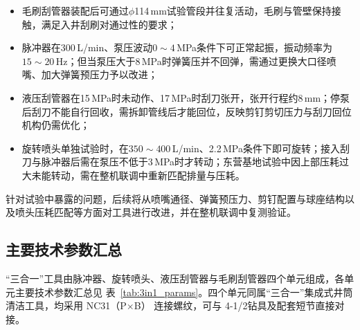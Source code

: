 \begin{itemize}
	\item 毛刷刮管器装配后可通过$\phi$114\,mm试验管段并往复活动，毛刷与管壁保持接触，满足入井刮刷对通过性的要求；
	\item 脉冲器在300\,L/min、泵压波动$0\sim4$\,MPa条件下可正常起振，振动频率为$15\sim20$\,Hz；但当泵压大于8\,MPa时弹簧压并不回弹，需通过更换大口径喷嘴、加大弹簧预压力予以改进；
	\item 液压刮管器在15\,MPa时未动作、17\,MPa时刮刀张开，张开行程约8\,mm；停泵后刮刀不能自行回收，需拆卸管线后才能回位，反映剪钉剪切压力与刮刀回位机构仍需优化；
	\item 旋转喷头单独试验时，在$350\sim400$\,L/min、2.2\,MPa条件下即可旋转；接入刮刀与脉冲器后需在泵压不低于3\,MPa时才转动；东营基地试验中因上部压耗过大未能转动，需在整机联调中重新匹配排量与压耗。
\end{itemize}

针对试验中暴露的问题，后续将从喷嘴通径、弹簧预压力、剪钉配置与球座结构以及喷头压耗匹配等方面对工具进行改进，并在整机联调中复测验证。

\subsection{主要技术参数汇总}

“三合一”工具由脉冲器、旋转喷头、液压刮管器与毛刷刮管器四个单元组成，各单元主要技术参数汇总见
表~\ref{tab:3in1_params}。四个单元同属“三合一”集成式井筒清洁工具，均采用 NC31（P$\times$B）
连接螺纹，可与 4-1/2\inch 钻具及配套短节直接对接。

